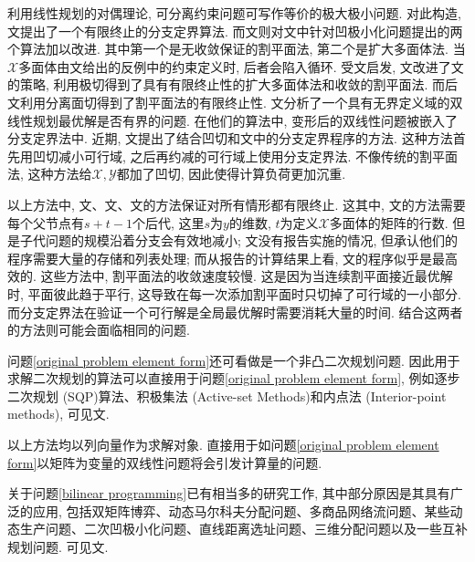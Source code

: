 \documentclass[UTF8,10.5pt,a4paper]{ctexart}
\theoremstyle{definition}
\theoremstyle{definition}
\begin{document}
\par 利用线性规划的对偶理论, 可分离约束问题可写作等价的极大极小问题. 对此构造, 文\cite{Falk1973}提出了一个有限终止的分支定界算法. 而文\cite{Gallo1977}则对文\cite{Tuy1964Concave}中针对凹极小化问题提出的两个算法加以改进. 其中第一个是无收敛保证的割平面法, 第二个是扩大多面体法. 当$\mathcal{X}$多面体由文\cite{Zwart1973Nonlinear}给出的反例中的约束定义时, 后者会陷入循环. 受文\cite{Gallo1977}启发, 文\cite{Vaish1976The,Vaish1977A}改进了文\cite{Tuy1964Concave}的策略, 利用极切得到了具有有限终止性的扩大多面体法和收敛的割平面法. 而后文\cite{Sherali1980}利用分离面切得到了割平面法的有限终止性. 文\cite{Audet1999}分析了一个具有无界定义域的双线性规划最优解是否有界的问题. 在他们的算法中, 变形后的双线性问题被嵌入了分支定界法中. 近期, 文\cite{Alarie2001COncavity}提出了结合凹切和文\cite{Audet1999}中的分支定界程序的方法. 这种方法首先用凹切减小可行域, 之后再约减的可行域上使用分支定界法. 不像传统的割平面法, 这种方法给$\mathcal{X},\mathcal{Y}$都加了凹切, 因此使得计算负荷更加沉重. 
\par 以上方法中, 文\cite{Falk1973}、文\cite{Vaish1976The}、文\cite{Sherali1980}的方法保证对所有情形都有限终止. 这其中, 文\cite{Falk1973}的方法需要每个父节点有$s+t-1$个后代, 这里$s$为$y$的维数, $t$为定义$\mathcal{X}$多面体的矩阵的行数. 但是子代问题的规模沿着分支会有效地减小; 文\cite{Vaish1976The}没有报告实施的情况, 但承认他们的程序需要大量的存储和列表处理; 而从报告的计算结果上看, 文\cite{Sherali1980}的程序似乎是最高效的. 这些方法中, 割平面法的收敛速度较慢. 这是因为当连续割平面接近最优解时, 平面彼此趋于平行, 这导致在每一次添加割平面时只切掉了可行域的一小部分. 而分支定界法在验证一个可行解是全局最优解时需要消耗大量的时间. 结合这两者的方法则可能会面临相同的问题. 
\par 问题\eqref{original problem element form}还可看做是一个非凸二次规划问题. 因此用于求解二次规划的算法可以直接用于问题\eqref{original problem element form}, 例如逐步二次规划 (SQP)算法、积极集法 (Active-set Methods)和内点法 (Interior-point methods), 可见文\cite{Nocedal2006Numerical}. 
\par 以上方法均以列向量作为求解对象. 直接用于如问题\eqref{original problem element form}以矩阵为变量的双线性问题将会引发计算量的问题.
\par 关于问题\eqref{bilinear programming}已有相当多的研究工作, 其中部分原因是其具有广泛的应用, 包括双矩阵博弈、动态马尔科夫分配问题、多商品网络流问题、某些动态生产问题、二次凹极小化问题、直线距离选址问题、三维分配问题以及一些互补规划问题. 可见文\cite{Vaish1974Nonconvex,Frieze1974A,Ibaraki1971Complementary,Konno1976Maximization,Konno1971Bilinear,Sherali1977The}.
\end{document}
